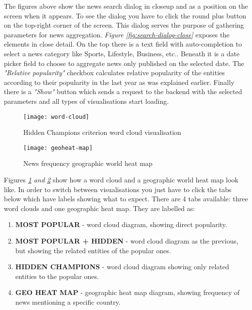 The figures above show the news search dialog in closeup and as a position on the screen when it appears. To see the dialog you have to click the round plus button on the top-right corner of the screen. This dialog serves the purpose of gathering parameters for news aggregation. \textit{Figure  \ref{fig:search-dialog-close}} exposes the elements in close detail. On the top there is a text field with auto-completion to select a news category like Sports, Lifestyle, Business, etc.. Beneath it is a date picker field to choose to aggregate news only published on the selected date. The \textit{"Relative popularity"} checkbox calculates relative popularity of the entities according to their popularity in the last year as was explained earlier. Finally there is a \textit{"Show"} button which sends a request to the backend with the selected parameters and all types of visualisations start loading.

\newpage

\begin{figure}[h!]
    \centering
    \texttt{[image: word-cloud]}
    \caption{Hidden Champions criterion word cloud visualisation}
    \label{fig:word-cloud-hidden-champions}
\end{figure}

\begin{figure}[h!]
    \centering
    \texttt{[image: geoheat-map]}
    \caption{News frequency geographic world heat map}
    \label{fig:geoheat-map}
\end{figure}

Figures \textit{\ref{fig:word-cloud-hidden-champions} and \ref{fig:geoheat-map}} show how a word cloud and a geographic world heat map look like. In order to switch between visualisations you just have to click the tabs below which have labels showing what to expect. There are 4 tabs available: three word clouds and one geographic heat map. They are labelled as:
\begin{enumerate}
    \item \textbf{MOST POPULAR} - word cloud diagram, showing direct popularity.
    \item \textbf{MOST POPULAR + HIDDEN} - word cloud diagram as the previous, but showing the related entities of the popular ones.
    \item \textbf{HIDDEN CHAMPIONS} - word cloud diagram showing only related entities to the popular ones.
    \item \textbf{GEO HEAT MAP} - geographic heat map diagram, showing frequency of news mentioning a specific country.
\end{enumerate}

